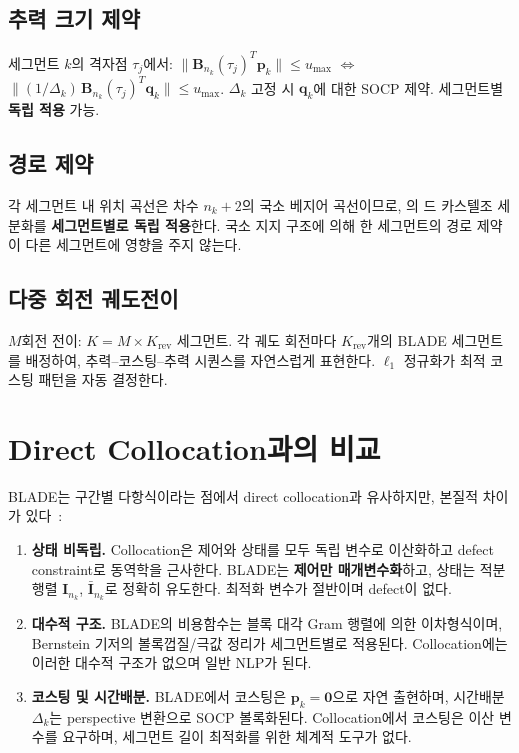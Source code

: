 \documentclass[11pt]{article}
\begin{document}
\subsection{추력 크기 제약}

세그먼트 $k$의 격자점 $\tau_j$에서:
$\|\mathbf{B}_{n_k}(\tau_j)^T \mathbf{p}_k\| \le u_{\max}$
$\Leftrightarrow$
$\|(1/\Delta_k)\, \mathbf{B}_{n_k}(\tau_j)^T \mathbf{q}_k\| \le u_{\max}$.
$\Delta_k$ 고정 시 $\mathbf{q}_k$에 대한 SOCP 제약.
세그먼트별 \textbf{독립 적용} 가능.

\subsection{경로 제약}

각 세그먼트 내 위치 곡선은 차수 $n_k + 2$의 국소 베지어 곡선이므로,
\cite{report013}의 드 카스텔조 세분화를 \textbf{세그먼트별로 독립 적용}한다.
국소 지지 구조에 의해 한 세그먼트의 경로 제약이 다른 세그먼트에 영향을 주지 않는다.

\subsection{다중 회전 궤도전이}

$M$회전 전이: $K = M \times K_{\mathrm{rev}}$ 세그먼트.
각 궤도 회전마다 $K_{\mathrm{rev}}$개의 BLADE 세그먼트를 배정하여,
추력--코스팅--추력 시퀀스를 자연스럽게 표현한다.
$\ell_1$ 정규화가 최적 코스팅 패턴을 자동 결정한다.


\section{Direct Collocation과의 비교}
\label{sec:collocation}

BLADE는 구간별 다항식이라는 점에서 direct collocation과 유사하지만,
본질적 차이가 있다~\cite{efc005}:

\begin{enumerate}
\item \textbf{상태 비독립.}
  Collocation은 제어와 상태를 모두 독립 변수로 이산화하고
  defect constraint로 동역학을 근사한다.
  BLADE는 \textbf{제어만 매개변수화}하고,
  상태는 적분 행렬 $\mathbf{I}_{n_k}$, $\bar{\mathbf{I}}_{n_k}$로 정확히 유도한다.
  최적화 변수가 절반이며 defect이 없다.

\item \textbf{대수적 구조.}
  BLADE의 비용함수는 블록 대각 Gram 행렬에 의한 이차형식이며,
  Bernstein 기저의 볼록껍질/극값 정리가 세그먼트별로 적용된다.
  Collocation에는 이러한 대수적 구조가 없으며 일반 NLP가 된다.

\item \textbf{코스팅 및 시간배분.}
  BLADE에서 코스팅은 $\mathbf{p}_k = \mathbf{0}$으로 자연 출현하며,
  시간배분 $\Delta_k$는 perspective 변환으로 SOCP 볼록화된다.
  Collocation에서 코스팅은 이산 변수를 요구하며,
  세그먼트 길이 최적화를 위한 체계적 도구가 없다.
\end{enumerate}
\end{document}
